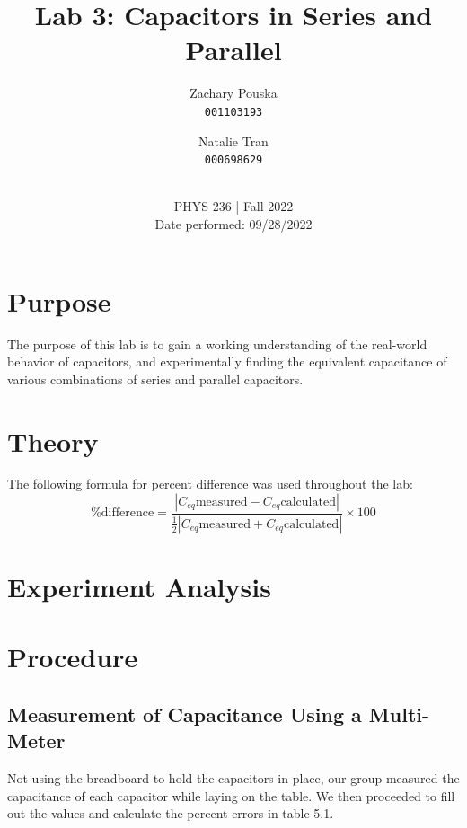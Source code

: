 \documentclass[titlepage]{article}
\begin{document}
\title{\textbf{Lab 3: Capacitors in Series and Parallel}}
\author{
    Zachary Pouska\\
    \texttt{001103193}\\
    \and
    Natalie Tran \\ 
    \texttt{000698629}\\ \\
} 

\date{PHYS 236 | Fall 2022\\
Date performed: 09/28/2022}


	\maketitle



	\section{Purpose}
    The purpose of this lab is to gain a working understanding of the real-world behavior of capacitors, and experimentally finding the equivalent capacitance of various combinations of series and parallel capacitors.

	\section{Theory}	

    The following formula for percent difference was used throughout the lab: $$\text{\% difference} = \frac{|C_{eq}\text{measured} - C_{eq}\text{calculated} |}{\frac{1}{2} |C_{eq}\text{measured} + C_{eq}\text{calculated}|} \times 100$$



	\section{Experiment Analysis}
    



	\section{Procedure}

        \subsection{Measurement of Capacitance Using a Multi-Meter}
        Not using the breadboard to hold the capacitors in place, our group measured the capacitance of each capacitor while laying on the table. We then proceeded to fill out the values and calculate the percent errors in table 5.1.
\end{document}
